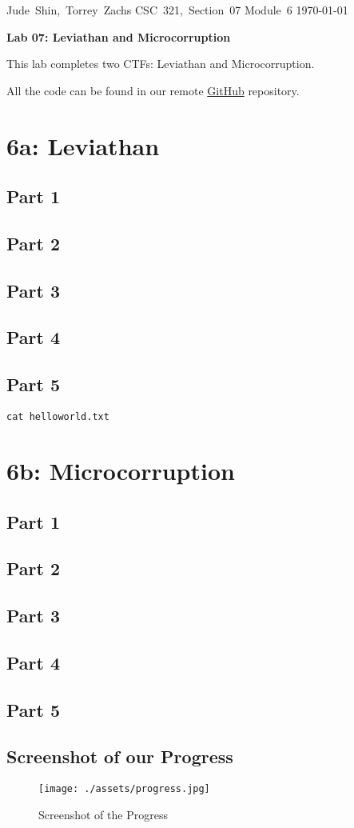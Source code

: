 \documentclass[11pt]{article}
\begin{document}
\hfill\vbox{\hbox{Jude Shin, Torrey Zachs}
		\hbox{CSC 321, Section 07}	
		\hbox{Module 6}	
		\hbox{\today}}\par

\bigskip
\centerline{\Large\bf Lab 07: Leviathan and Microcorruption}\par
\bigskip

This lab completes two CTFs: Leviathan and Microcorruption.

All the code can be found in our remote \href{https://github.com/jude-shin/CSC\_321}{GitHub} repository.


\section*{6a: Leviathan}
\subsection*{Part 1}
\subsection*{Part 2}
\subsection*{Part 3}
\subsection*{Part 4}
\subsection*{Part 5}

\verb|cat helloworld.txt|



\section*{6b: Microcorruption}
\subsection*{Part 1}
\subsection*{Part 2}
\subsection*{Part 3}
\subsection*{Part 4}
\subsection*{Part 5}

\subsection*{Screenshot of our Progress}
\begin{figure}[!ht]
	\centering
	\texttt{[image: ./assets/progress.jpg]}
	\caption{Screenshot of the Progress}
	\label{fig:progress}
\end{figure}
\end{document}
